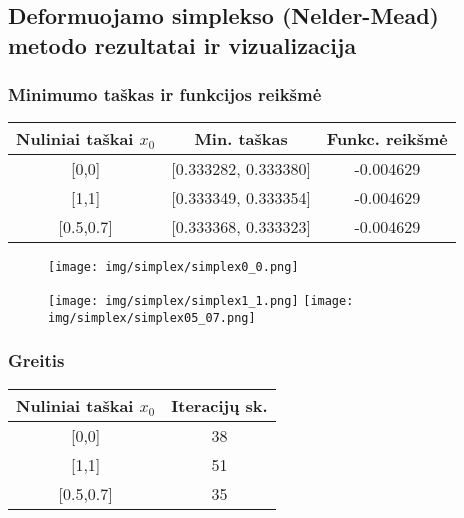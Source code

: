 \documentclass{article}
\begin{document}
\subsection{Deformuojamo simplekso (Nelder-Mead) metodo rezultatai ir vizualizacija}
\subsubsection{Minimumo taškas ir funkcijos reikšmė}
\begin{table}[H]
    \centering
    \begin{tabular}{|c|c|c|} 
    \hline
    Nuliniai taškai $x_{0}$ & Min. taškas            & Funkc. reikšmė  \\ 
    \hline
    {[}0,0]            & {[}0.333282, 0.333380] & -0.004629       \\ 
    \hline
    {[}1,1]            & {[}0.333349, 0.333354] & -0.004629       \\ 
    \hline
    {[}0.5,0.7]        & {[}0.333368, 0.333323] & -0.004629       \\
    \hline
    \end{tabular}
\end{table}
\begin{figure}[H]
    \centering
    \texttt{[image: img/simplex/simplex0\_0.png]}
\end{figure}
\begin{figure}[H]
    \texttt{[image: img/simplex/simplex1\_1.png]}
    \texttt{[image: img/simplex/simplex05\_07.png]}
\end{figure}

\subsubsection{Greitis}
\begin{table}[H]
    \centering
    \begin{tabular}{|c|c|} 
    \hline
    Nuliniai taškai $x_{0}$ & Iteracijų sk.  \\ 
    \hline
    {[}0,0]            & 38             \\ 
    \hline
    {[}1,1]            & 51             \\ 
    \hline
    {[}0.5,0.7]        & 35             \\
    \hline
    \end{tabular}
\end{table}
\end{document}
